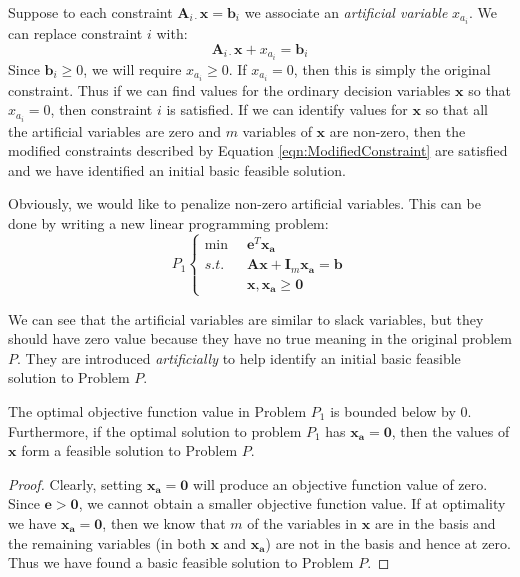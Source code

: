 Suppose to each constraint $\mathbf{A}_{i\cdot}\mathbf{x} = \mathbf{b}_i$ we associate an \textit{artificial variable} ${x_{a_i}}$. We can replace constraint $i$ with:
\begin{equation}
\mathbf{A}_{i\cdot}\mathbf{x} + {x_{a_i}} = \mathbf{b}_i
\label{eqn:ModifiedConstraint}
\end{equation}
Since $\mathbf{b}_i \geq 0$, we will require $x_{a_i} \geq 0$. If ${x_{a_i}} = 0$, then this is simply the original constraint. Thus if we can find values for the ordinary decision variables $\mathbf{x}$ so that $x_{a_i}=0$, then constraint $i$ is satisfied. If we can identify values for $\mathbf{x}$ so that all the artificial variables are zero and $m$ variables of $\mathbf{x}$ are non-zero, then the modified constraints described by Equation \ref{eqn:ModifiedConstraint} are satisfied and we have identified an initial basic feasible solution. 

Obviously, we would like to penalize non-zero artificial variables. This can be done by writing a new linear programming problem:
\begin{equation}
P_1\left\{
\begin{aligned}
\min\;\; & \mathbf{e}^T\mathbf{x_a}\\
s.t.\;\; & \mathbf{A}\mathbf{x} + \mathbf{I}_m\mathbf{x_a} = \mathbf{b}\\
& \mathbf{x},\mathbf{x_a} \geq \mathbf{0}
\end{aligned}\right.
\end{equation}

\begin{remark} We can see that the artificial variables are similar to slack variables, but they should have zero value because they have no true meaning in the original problem $P$. They are introduced \textit{artificially} to help identify an initial basic feasible solution to Problem $P$. 
\end{remark}

\begin{lemma} The optimal objective function value in Problem $P_1$ is bounded below by $0$. Furthermore, if the optimal solution to problem $P_1$ has $\mathbf{x_a} = \mathbf{0}$, then the values of $\mathbf{x}$ form a feasible solution to Problem $P$. 
\label{lem:PhaseILem}
\end{lemma}

\begin{proof} Clearly, setting $\mathbf{x_a}= \mathbf{0}$ will produce an objective function value of zero. Since $\mathbf{e} > \mathbf{0}$, we cannot obtain a smaller objective function value. If at optimality we have $\mathbf{x_a} = \mathbf{0}$, then we know that $m$ of the variables in $\mathbf{x}$ are in the basis and the remaining variables (in both $\mathbf{x}$ and $\mathbf{x_a}$) are not in the basis and hence at zero. Thus we have found a basic feasible solution to Problem $P$. 
\end{proof}

